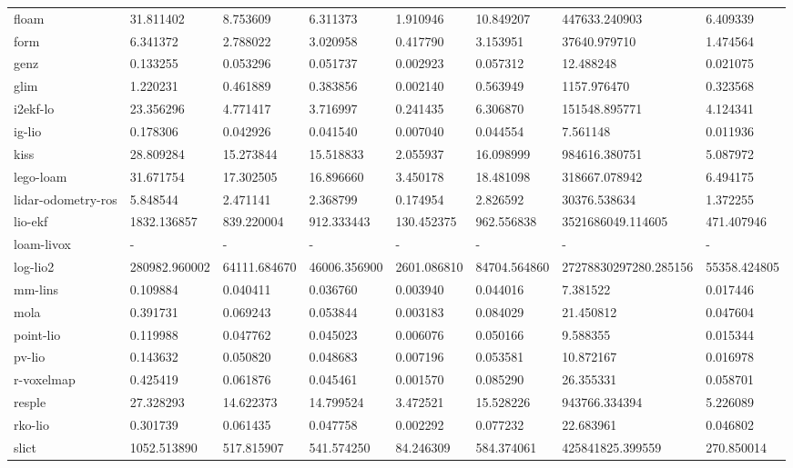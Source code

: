 \begin{table}[]
{\begin{tabular}{llllllll}
		floam & 31.811402 & 8.753609 & 6.311373 & 1.910946 & 10.849207 & 447633.240903 & 6.409339 \\
		form & 6.341372 & 2.788022 & 3.020958 & 0.417790 & 3.153951 & 37640.979710 & 1.474564 \\
		genz & 0.133255 & 0.053296 & 0.051737 & 0.002923 & 0.057312 & 12.488248 & 0.021075 \\
		glim & 1.220231 & 0.461889 & 0.383856 & 0.002140 & 0.563949 & 1157.976470 & 0.323568 \\
		i2ekf-lo & 23.356296 & 4.771417 & 3.716997 & 0.241435 & 6.306870 & 151548.895771 & 4.124341 \\
		ig-lio & 0.178306 & 0.042926 & 0.041540 & 0.007040 & 0.044554 & 7.561148 & 0.011936 \\
		kiss & 28.809284 & 15.273844 & 15.518833 & 2.055937 & 16.098999 & 984616.380751 & 5.087972 \\
		lego-loam & 31.671754 & 17.302505 & 16.896660 & 3.450178 & 18.481098 & 318667.078942 & 6.494175 \\
		lidar-odometry-ros & 5.848544 & 2.471141 & 2.368799 & 0.174954 & 2.826592 & 30376.538634 & 1.372255 \\
		lio-ekf & 1832.136857 & 839.220004 & 912.333443 & 130.452375 & 962.556838 & 3521686049.114605 & 471.407946 \\
		loam-livox & - & - & - & - & - & - & - \\
		log-lio2 & 280982.960002 & 64111.684670 & 46006.356900 & 2601.086810 & 84704.564860 & 27278830297280.285156 & 55358.424805 \\
		mm-lins & 0.109884 & 0.040411 & 0.036760 & 0.003940 & 0.044016 & 7.381522 & 0.017446 \\
		mola & 0.391731 & 0.069243 & 0.053844 & 0.003183 & 0.084029 & 21.450812 & 0.047604 \\
		point-lio & 0.119988 & 0.047762 & 0.045023 & 0.006076 & 0.050166 & 9.588355 & 0.015344 \\
		pv-lio & 0.143632 & 0.050820 & 0.048683 & 0.007196 & 0.053581 & 10.872167 & 0.016978 \\
		r-voxelmap & 0.425419 & 0.061876 & 0.045461 & 0.001570 & 0.085290 & 26.355331 & 0.058701 \\
		resple & 27.328293 & 14.622373 & 14.799524 & 3.472521 & 15.528226 & 943766.334394 & 5.226089 \\
		rko-lio & 0.301739 & 0.061435 & 0.047758 & 0.002292 & 0.077232 & 22.683961 & 0.046802 \\
		slict & 1052.513890 & 517.815907 & 541.574250 & 84.246309 & 584.374061 & 425841825.399559 & 270.850014 \\

\end{tabular}}
\end{table}
